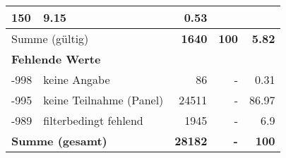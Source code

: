 \begin{longtable}{lXrrr}
       \num{150} &
       \num[round-mode=places,round-precision=2]{9,15} &
         \num[round-mode=places,round-precision=2]{0,53} \\
     \midrule
     \multicolumn{2}{l}{Summe (gültig)} &
       \textbf{\num{1640}} &
     \textbf{100} &
       \textbf{\num[round-mode=places,round-precision=2]{5,82}} \\
     \multicolumn{5}{l}{\textbf{Fehlende Werte}}\\
       -998 &
       keine Angabe &
         \num{86} &
        - &
         \num[round-mode=places,round-precision=2]{0,31} \\
       -995 &
       keine Teilnahme (Panel) &
         \num{24511} &
        - &
         \num[round-mode=places,round-precision=2]{86,97} \\
       -989 &
       filterbedingt fehlend &
         \num{1945} &
        - &
         \num[round-mode=places,round-precision=2]{6,9} \\
     \midrule
     \multicolumn{2}{l}{\textbf{Summe (gesamt)}} &
          \textbf{\num{28182}} &
        \textbf{-} &
        \textbf{100} \\
     \bottomrule
     \end{longtable}
     
